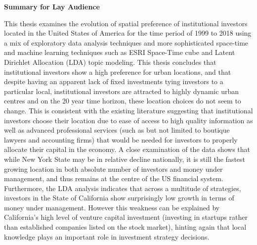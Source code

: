 \documentclass[12pt,twoside]{report}
\numberwithin{figure}{chapter}
\newenvironment{preliminary}%
{\pagestyle{plain}\pagenumbering{roman}}%
{\pagenumbering{arabic}}
\begin{document}
\begin{preliminary}
\Large\begin{center}\textbf{Summary for Lay Audience}\end{center}\normalsize
\begin{spacing}{2}
	This thesis examines the evolution of spatial preference of institutional investors located in the United States of America for the time period of 1999 to 2018 using a mix of exploratory data analysis techniques and more sophisticated space-time and machine learning techniques such as ESRI Space-Time cube and Latent Dirichlet Allocation (LDA) topic modeling.  This thesis concludes that institutional investors show a high preference for urban locations, and that despite having an apparent lack of fixed investments tying investors to a particular local, institutional investors are attracted to highly dynamic urban centres and on the 20 year time horizon, these location choices do not seem to change.  This is consistent with the existing literature suggesting that institutional investors choose their location due to ease of access to high quality information as well as advanced professional services (such as but not limited to boutique lawyers and accounting firms) that would be needed for investors to properly allocate their capital in the economy.  A close examination of the data shows that while New York State may be in relative decline nationally, it is still the fastest growing location in both absolute number of investors and money under management, and thus remains at the centre of the US financial system. Furthermore, the LDA analysis indicates that across a multitude of strategies, investors in the State of California show surprisingly low growth in terms of money under management.  However this weakness can be explained by California's high level of venture capital investment (investing in startups rather than established companies listed on the stock market), hinting again that local knowledge plays an important role in investment strategy decisions. 
	

\end{spacing}
\end{preliminary}
\end{document}
